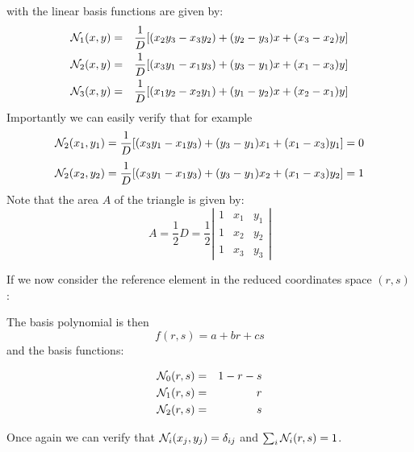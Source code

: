 with the linear basis functions are given by:
\begin{eqnarray}
{\mathcal{N}}_1(x,y) &=& \frac{1}{D}[(x_2y_3-x_3y_2) + (y_2-y_3)x + (x_3-x_2)y] \nonumber\\
{\mathcal{N}}_2(x,y) &=& \frac{1}{D}[(x_3y_1-x_1y_3) + (y_3-y_1)x + (x_1-x_3)y] \nonumber\\
{\mathcal{N}}_3(x,y) &=& \frac{1}{D}[(x_1y_2-x_2y_1) + (y_1-y_2)x + (x_2-x_1)y] \nonumber
\end{eqnarray}
Importantly we can easily verify that for example
\[
{\mathcal{N}}_2(x_1,y_1)= \frac{1}{D}[(x_3y_1-x_1y_3) + (y_3-y_1)x_1 + (x_1-x_3)y_1] = 0
\]
\[
{\mathcal{N}}_2(x_2,y_2)= \frac{1}{D}[(x_3y_1-x_1y_3) + (y_3-y_1)x_2 + (x_1-x_3)y_2] = 1
\]
Note that the area $A$ of the triangle is given by:
\[
A=\frac{1}{2}D = \frac{1}{2}
\left|
\begin{array}{ccc}
1 & x_1 & y_1 \\
1 & x_2 & y_2 \\
1 & x_3 & y_3 
\end{array}
\right|
\]

\noindent If we now consider the reference element in the reduced coordinates space $(r,s)$:



The basis polynomial is then
\[
f(r,s) = a + br + cs 
\]
and the basis functions:
\begin{mdframed}[backgroundcolor=blue!5]
\begin{eqnarray}
{\mathcal{N}}_0(r,s) &=& 1-r-s \\
{\mathcal{N}}_1(r,s) &=& r \\
{\mathcal{N}}_2(r,s) &=& s 
\end{eqnarray}
\end{mdframed}
Once again we can verify that ${\mathcal{N}}_i(x_j,y_j)=\delta_{ij}$ and $\sum_i {\mathcal{N}}_i(r,s)=1$.



